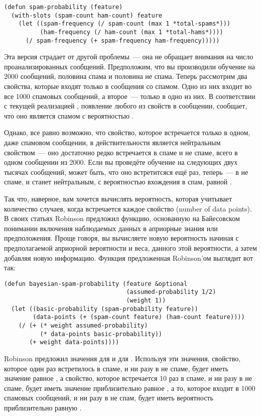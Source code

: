 \begin{lstlisting}
(defun spam-probability (feature)
  (with-slots (spam-count ham-count) feature
    (let ((spam-frequency (/ spam-count (max 1 *total-spams*)))
          (ham-frequency (/ ham-count (max 1 *total-hams*))))
      (/ spam-frequency (+ spam-frequency ham-frequency)))))
\end{lstlisting}

Эта версия страдает от другой проблемы~--- она не обращает внимания на число
проанализированных сообщений.  Предположим, что вы производили обучение на 2000 сообщений,
половина спама и половина не спама.  Теперь рассмотрим два свойства, которые входят только
в сообщения со спамом.  Одно из них входит во все 1000 спамовых сообщений, а второе~---
только в одно из них.  В соответствии с текущей реализацией ,
появление любого из свойств в сообщении, сообщает, что оно является спамом с вероятностью
.

Однако, все равно возможно, что свойство, которое встречается только в одном, даже
спамовом сообщении, в действительности является нейтральным свойством~--- оно достаточно
редко встречается в спаме и не спаме, всего в одном сообщении из 2000.  Если вы проведёте
обучение на следующих двух тысячах сообщений, может быть, что оно встретитсяся ещё раз,
теперь~--- в не спаме, и станет нейтральным, с вероятностью вхождения в спам, равной
.

Так что, наверное, вам хочется вычислять вероятность, которая учитывает количество
случаев, когда встречается каждое свойство (number of data points).  В своих статьях
Robinson предложил функцию, основанную на Байесовском понимании включения наблюдаемых
данных в априорные знания или предположения. Проще говоря, вы вычисляете новую вероятность
начиная с предполагаемой априорной вероятности и веса, данного этой вероятности, а затем
добавляя новую информацию. Функция предложенная Robinson'ом выглядит вот так:

\begin{lstlisting}
(defun bayesian-spam-probability (feature &optional
                                  (assumed-probability 1/2)
                                  (weight 1))
  (let ((basic-probability (spam-probability feature))
        (data-points (+ (spam-count feature) (ham-count feature))))
    (/ (+ (* weight assumed-probability)
          (* data-points basic-probability))
       (+ weight data-points))))
\end{lstlisting}

Robinson предложил значения  для  и  для
.  Используя эти значения, свойство, которое один раз встретилось в спаме, и
ни разу в не спаме, будет иметь значение  равное
, а свойство, которое встречается 10 раз в спаме, и ни разу в не спаме, будет
иметь значение  приблизительно равное , а то,
которое входит в 1000 спамовых сообщений, и ни разу в не спам, будет иметь вероятность
приблизительно равную .

